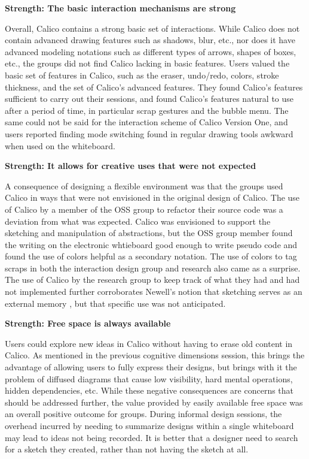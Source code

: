 \textbf{Strength: The basic interaction mechanisms are strong}

Overall, Calico contains a strong basic set of interactions. While Calico does not contain advanced drawing features such as shadows, blur, etc., nor does it have advanced modeling notations such as different types of arrows, shapes of boxes, etc., the groups did not find Calico lacking in basic features. Users valued the basic set of features in Calico, such as the eraser, undo/redo, colors, stroke thickness, and the set of Calico's advanced features. They found Calico's features sufficient to carry out their sessions, and found Calico's features natural to use after a period of time, in particular scrap gestures and the bubble menu. The same could not be said for the interaction scheme of Calico Version One, and users reported finding mode switching found in regular drawing tools awkward when used on the whiteboard.

\textbf{Strength: It allows for creative uses that were not expected}

A consequence of designing a flexible environment was that the groups used Calico in ways that were not envisioned in the original design of Calico. The use of Calico by a member of the OSS group to refactor their source code was a deviation from what was expected. Calico was envisioned to support the sketching and manipulation of abstractions, but the OSS group member found the writing on the electronic whtieboard good enough to write pseudo code and found the use of colors helpful as a secondary notation. The use of colors to tag scraps in both the interaction design group and research also came as a surprise. The use of Calico by the research group to keep track of what they had and had not implemented further corroborates Newell's notion that sketching serves as an external memory \cite{Newell}, but that specific use was not anticipated.

\textbf{Strength: Free space is always available}

Users could explore new ideas in Calico without having to erase old content in Calico. As mentioned in the previous cognitive dimensions session, this brings the advantage of allowing users to fully express their designs, but brings with it the problem of diffused diagrams that cause low visibility, hard mental operations, hidden dependencies, etc. While these negative consequences are concerns that should be addressed further, the value provided by easily available free space was an overall positive outcome for groups. During informal design sessions, the overhead incurred by needing to summarize designs within a single whiteboard may lead to ideas not being recorded. It is better that a designer need to search for a sketch they created, rather than not having the sketch at all.

